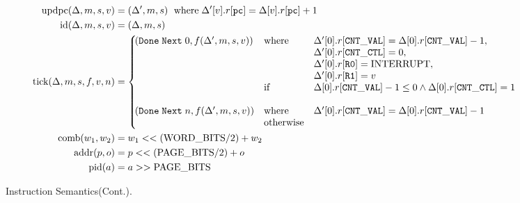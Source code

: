 \documentclass[a4paper]{article}
\newcommand*{\PPBITS}{\text{PAGE\_BITS}}
\newcommand*{\PWBITS}{\text{WORD\_BITS}}
\newcommand*{\updpc}{\text{updpc}}
\newcommand*{\pid}{\text{pid}}
\begin{document}
\begin{figure}[!h]
  \begin{align*}
    \updpc(\Delta,m,s,v)&=(\Delta',m,s)\ \; \text{where}\; \Delta'[v].r[\mathtt{pc}] = \Delta[v].r[\mathtt{pc}]+1\\
    \text{id}(\Delta,m,s,v)& = (\Delta,m,s)\\
    \nextt(\Delta,m,s,f,v,n)&= \left\{\!\!\!\!\begin{array}{lll}
                                \DNXT{0}{f(\Delta',m,s,v)} &\text{where } %
                                & \Delta'[0].r[\mathtt{CNT\_VAL}] = \Delta[0].r[\mathtt{CNT\_VAL}] -1,\\
                                & &\Delta'[0].r[\mathtt{CNT\_CTL}] = 0,\\
                                & &\Delta'[0].r[\mathtt{R0}]=\toword{INTERRUPT},\\
                                & &\Delta'[0].r[\mathtt{R1}] = v\\
                                & \text{if}%
                                &\Delta[0].r[\mathtt{CNT\_VAL}] -1 \le 0\land\Delta[0].r[\mathtt{CNT\_CTL}] = 1\\
                                \\
                                \DNXT{n}{f(\Delta',m,s,v)} &\text{where}%
                                &\Delta'[0].r[\mathtt{CNT\_VAL}] = \Delta[0].r[\mathtt{CNT\_VAL}] -1\\
                                & \text{otherwise}\\
                                              \end{array}  \right.\\
    \text{comb}(w_{1},w_{2})&=w_{1}<<(\PWBITS/2)+w_{2}\\
    \text{addr}(p,o)&=p<<(\PPBITS/2)+o \\
    \pid(a) &= a >> \PPBITS
  \end{align*}
  \caption{Instruction Semantics(Cont.).}
\end{figure}
\end{document}
